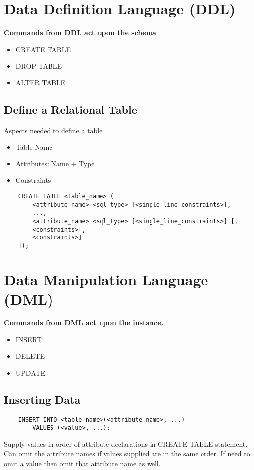 \documentclass[twoside]{article}
\begin{document}
\section*{Data Definition Language (DDL)}

\textbf{Commands from DDL act upon the schema}
\begin{itemize}
    \item CREATE TABLE
    \item DROP TABLE
    \item ALTER TABLE
\end{itemize}

\subsection*{Define a Relational Table}
Aspects needed to define a table:
\begin{itemize}
    \item Table Name
    \item Attributes: Name + Type
    \item Constraints
\end{itemize}

\begin{verbatim}
    CREATE TABLE <table_name> (
        <attribute_name> <sql_type> [<single_line_constraints>],
        ...,
        <attribute_name> <sql_type> [<single_line_constraints>] [,
        <constraints>[,
        <constraints>]
    ]);
\end{verbatim}

\section*{Data Manipulation Language (DML)}

\textbf{Commands from DML act upon the instance.}
\begin{itemize}
    \item INSERT
    \item DELETE
    \item UPDATE
\end{itemize}

\subsection*{Inserting Data}
\begin{verbatim}
    INSERT INTO <table_name>(<attribute_name>, ...)
        VALUES (<value>, ...);
\end{verbatim}
Supply values in order of attribute declarations in CREATE TABLE statement.
Can omit the attribute names if values supplied are in the same order. If need 
to omit
a value then omit that attribute name as well.
\end{document}
